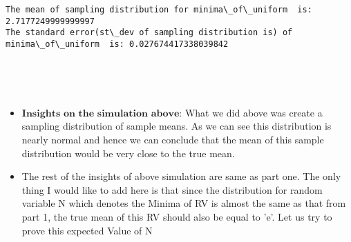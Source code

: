 \documentclass[11pt]{article}
\begin{document}
    \begin{Verbatim}[commandchars=\\\{\}]
The mean of sampling distribution for minima\_of\_uniform  is:  2.7177249999999997
The standard error(st\_dev of sampling distribution is) of  minima\_of\_uniform  is: 0.027674417338039842

    \end{Verbatim}

    \begin{center}
    \end{center}
    { \hspace*{\fill} \\}
    
    \begin{center}
    \end{center}
    { \hspace*{\fill} \\}
    
    \begin{itemize}
\item
  \(\textbf{Insights on the simulation above}\): What we did above was
  create a sampling distribution of sample means. As we can see this
  distribution is nearly normal and hence we can conclude that the mean
  of this sample distribution would be very close to the true mean.
\item
  The rest of the insights of above simulation are same as part one. The
  only thing I would like to add here is that since the distribution for
  random variable N which denotes the Minima of RV is almost the same as
  that from part 1, the true mean of this RV should also be equal to
  'e'. Let us try to prove this expected Value of N
\end{itemize}
\end{document}
